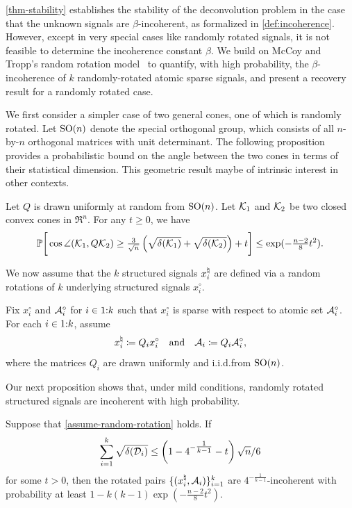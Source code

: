 \autoref{thm-stability} establishes the stability of the deconvolution problem in the case that the unknown signals are $\beta$-incoherent, as formalized in \autoref{def:incoherence}. However, except in very special cases like randomly rotated signals, it is not feasible to determine the incoherence constant $\beta$. We build on McCoy and Tropp's random rotation model~\cite{mccoy2013achievable} to quantify, with high probability, the $\beta$-incoherence of $k$ randomly-rotated atomic sparse signals, and present a recovery result for a randomly rotated case.

We first consider a simpler case of two general cones, one of which is randomly rotated. Let $\operatorname{SO}(n)$ denote the special orthogonal group, which consists of all $n$-by-$n$ orthogonal matrices with unit determinant. The following proposition provides a probabilistic bound on the angle between the two cones in terms of their statistical dimension. This geometric result maybe of intrinsic interest in other contexts.

\begin{proposition} \label{prop-angle-cones}
    Let $Q$ is drawn uniformly at random from $\operatorname{SO}(n)$. Let $\mathcal{K}_1$ and $\mathcal{K}_2$ be two closed convex cones in $\Re^n$. For any $t \geq 0$, we have
\[\mathbb{P}\bigg[\cos\angle(\mathcal{K}_1, Q\mathcal{K}_2) \geq  \tfrac{3}{\sqrt{n}}\left(\sqrt{\delta(\mathcal{K}_1)} + \sqrt{\delta(\mathcal{K}_2)}\right) + t\bigg] \leq \exp(-\tfrac{n-2}{8}t^2). \]
\end{proposition}

We now assume that the $k$ structured signals $x_i^{\natural}$ are defined via a random rotations of $k$ underlying structured signals $x_i^\circ$.
\begin{assumption}\label{assume-random-rotation}
   Fix $x_i^\circ$ and $\mathcal{A}_i^\circ$ for $i\in1\mathord{:}k$ such that $x_i^\circ$ is sparse with respect to atomic set $\mathcal{A}_i^\circ$. For each $i\in1\mathord{:}k$, assume 
  \begin{equation*}
    x_i^{\natural} \coloneqq Q_i  x_i^\circ \quad\mbox{and}\quad \mathcal{A}_i \coloneqq  Q_i \mathcal{A}_i^\circ,
  \end{equation*}
  where the matrices $Q_i$ are drawn uniformly and i.i.d.\@ from $\operatorname{SO}(n)$.
\end{assumption}

Our next proposition shows that, under mild conditions, randomly rotated structured signals are incoherent with high probability. 
\begin{proposition} \label{thm:Incoherence}
    Suppose that \autoref{assume-random-rotation} holds. If 
    \[\sum_{i=1}^k \sqrt{\delta(\mathcal{D}_i)} \leq \left(1 - 4^{- \tfrac{1}{k-1} } - t\right)\sqrt{n} / 6\] 
    for some $t>0$, then the rotated pairs $\{(x_i^{\natural},\mathcal{A}_i)\}_{i=1}^k$ are $4^{- \tfrac{1}{k-1} }$-incoherent with probability at least $1 - k(k-1)\exp(-\tfrac{n-2}{8}t^2)$.
\end{proposition}

